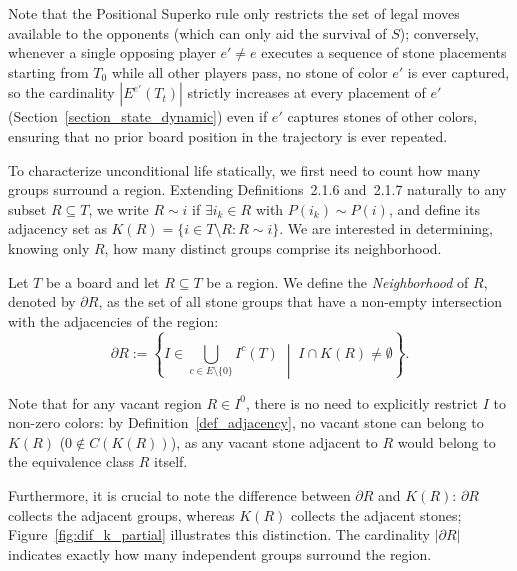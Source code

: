 Note that the Positional Superko rule only restricts the set of legal moves available to
the opponents (which can only aid the survival of $S$); conversely, whenever a single
opposing player $e' \neq e$ executes a sequence of stone placements starting from $T_0$ while all other players pass, no stone of color $e'$ is ever captured, so the cardinality $|E^{e'}(T_t)|$ strictly increases at every placement of $e'$ (Section~\ref{section_state_dynamic}) even if $e'$ captures stones of other colors, ensuring that no prior board position in the trajectory is ever repeated.

To characterize unconditional life statically, we first need to count how many groups surround a region. Extending Definitions~2.1.6 and~2.1.7 naturally to any subset $R \subseteq T$, we write $R \sim i$ if $\exists i_k \in R$ with $P(i_k) \sim P(i)$, and define its adjacency set as $K(R) = \{i \in T \setminus R : R \sim i\}$. We are interested in determining, knowing only $R$, how many distinct groups comprise its neighborhood.

\begin{definition}\label{def:vecindad_region}
	Let $T$ be a board and let $R \subseteq T$ be a region. We define the \emph{Neighborhood}
	of $R$, denoted by $\partial R$, as the set of all stone groups that have a non-empty
	intersection with the adjacencies of the region:
	\[
	\partial R := \left\{ I \in \bigcup_{c \in E \setminus \{0\}} I^c(T) \;\middle|\; I \cap K(R) \neq \emptyset \right\}.
	\]
\end{definition}

Note that for any vacant region $R \in I^0$, there is no need to explicitly restrict $I$ to non-zero colors: by Definition~\ref{def_adjacency}, no vacant stone can belong to $K(R)$ ($0 \notin C(K(R))$), as any vacant stone adjacent to $R$ would belong to the equivalence class $R$ itself. 

Furthermore, it is crucial to note the difference between $\partial R$ and $K(R)$: $\partial R$ collects the adjacent groups, whereas $K(R)$ collects the adjacent stones; Figure~\ref{fig:dif_k_partial} illustrates this distinction. The cardinality $|\partial R|$ indicates exactly how many independent groups surround the region.

